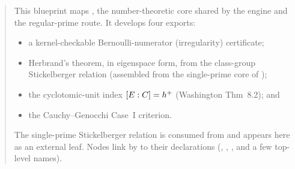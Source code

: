 \blueprintfrontmatter

\begin{abstract}
This blueprint maps , the number-theoretic core shared by
the engine and the regular-prime route. It develops four exports:
\begin{itemize}
  \item a kernel-checkable Bernoulli-numerator (irregularity) certificate;
  \item Herbrand's theorem, in eigenspace form, from the class-group Stickelberger
    relation (assembled from the single-prime core of );
  \item the cyclotomic-unit index $[E:C] = \hplus$ (Washington Thm~8.2); and
  \item the Cauchy--Genocchi Case~I criterion.
\end{itemize}
The single-prime Stickelberger relation is consumed from 
and appears here as an external leaf. Nodes link by  to
their declarations (, , , and
a few top-level names).
\end{abstract}





